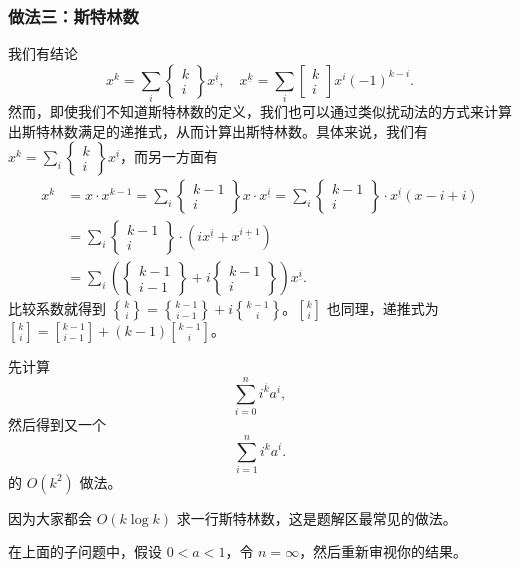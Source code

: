     \subsubsection*{做法三：斯特林数}
    我们有结论
    $$
    x^k=\sum_i \begin{Bmatrix}k\\i\end{Bmatrix}x^{\underline{i}},\quad x^{\underline{k}}=\sum_i\begin{bmatrix}k\\i\end{bmatrix}x^i(-1)^{k-i}.
    $$
    然而，即使我们不知道斯特林数的定义，我们也可以通过类似扰动法的方式来计算出斯特林数满足的递推式，从而计算出斯特林数。具体来说，我们有 $\displaystyle  x^k=\sum_i \begin{Bmatrix}k\\i\end{Bmatrix}x^{\underline{i}}$，而另一方面有
    $$
    \begin{aligned}
    x^k&=x\cdot x^{k-1}=\sum_i\begin{Bmatrix}k-1\\i\end{Bmatrix}x\cdot x^{\underline{i}}=\sum_i\begin{Bmatrix}k-1\\i\end{Bmatrix}\cdot x^{\underline{i}}(x-i+i)\\
    &=\sum_i\begin{Bmatrix}k-1\\i\end{Bmatrix}\cdot (ix^{\underline{i}}+x^{\underline{i+1}})\\
    &=\sum_i\left(\begin{Bmatrix}k-1\\i-1\end{Bmatrix}+i\begin{Bmatrix}k-1\\i\end{Bmatrix}\right)x^{\underline{i}}.
    \end{aligned}
    $$
    比较系数就得到 ${k\brace i}={k-1\brace i-1}+i{k-1\brace i}$。$k\brack i$ 也同理，递推式为 ${k\brack i}={k-1\brack i-1}+(k-1){k-1\brack i}$。

    \begin{exercise}[数列求和再再放送]
    先计算
    $$
    \sum_{i=0}^ni^{\overline{k}}a^i,
    $$
    然后得到又一个
        $$
        \sum_{i=1}^n i^ka^i.
        $$
    的 $O(k^2)$ 做法。
    \end{exercise}
    \begin{remark}
        因为大家都会 $O(k\log k)$ 求一行斯特林数，这是题解区最常见的做法。
    \end{remark}
    \begin{remark}
    在上面的子问题中，假设 $0<a<1$，令 $n=\infty$，然后重新审视你的结果。
    \end{remark}

